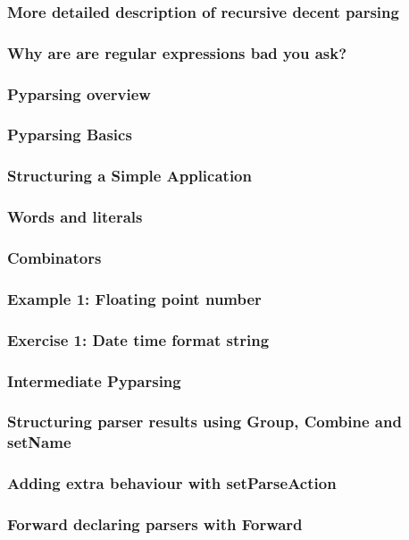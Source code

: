 \documentclass{beamer}
\begin{document}
\begin{frame}
\frametitle{More detailed description of recursive decent parsing}
\end{frame}

\begin{frame}
\frametitle{Why are are regular expressions bad you ask?}
\end{frame}

\begin{frame}
\frametitle{Pyparsing overview}
\end{frame}

\begin{frame}
\frametitle{Pyparsing Basics}
\end{frame}

\begin{frame}
\frametitle{Structuring a Simple Application}

\end{frame}

\begin{frame}
\frametitle{Words and literals}

\end{frame}

\begin{frame}
\frametitle{Combinators}
\end{frame}

\begin{frame}
\frametitle{Example 1: Floating point number}
\end{frame}

\begin{frame}
\frametitle{Exercise 1: Date time format string}

\end{frame}

\begin{frame}
\frametitle{Intermediate Pyparsing}

\end{frame}

\begin{frame}
\frametitle{Structuring parser results using Group, Combine and setName}
\end{frame}

\begin{frame}
\frametitle{Adding extra behaviour with setParseAction}
\end{frame}


\begin{frame}
\frametitle{Forward declaring parsers with Forward}
\end{frame}
\end{document}
